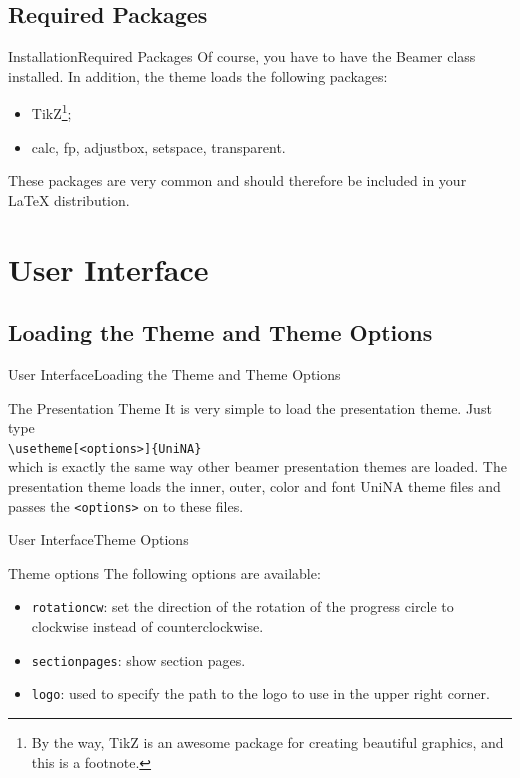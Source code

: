\documentclass[10pt,aspectratio=169
	]{beamer}
\begin{document}
\subsection{Required Packages}
\begin{frame}{Installation}{Required Packages}
  Of course, you have to have the Beamer class installed. In addition, the theme loads the following packages:
  \begin{itemize}
	\item TikZ\footnote[frame]{By the way, TikZ is an awesome package for creating beautiful graphics, and this is a footnote.};
    \item calc, fp, adjustbox, setspace, transparent.
  \end{itemize}
  These packages are very common and should therefore be included in your LaTeX distribution.
\end{frame}

\section{User Interface}
\subsection{Loading the Theme and Theme Options}
\begin{frame}{User Interface}{Loading the Theme and Theme Options}
  \begin{block}{The Presentation Theme}
    It is very simple to load the presentation theme. Just type\\
    {\tt \textbackslash usetheme[<options>]\{UniNA\}}\\
	which is exactly the same way other beamer presentation themes are loaded. 
	The presentation theme loads the inner, outer, color and font UniNA theme files 
	and passes the {\tt <options>} on to these files.
  \end{block}
\end{frame}

\begin{frame}{User Interface}{Theme Options}
  \begin{block}{Theme options}
    The following options are available:
  \begin{itemize}
	\item {\tt rotationcw}: set the direction of the rotation of the progress circle 
	to clockwise instead of counterclockwise.
    \item {\tt sectionpages}: show section pages.
    \item {\tt logo}: used to specify the path to the logo to use in the upper right corner.
  \end{itemize}
  \end{block}
\end{frame}
\end{document}
